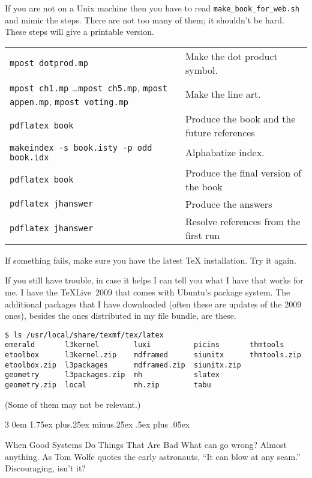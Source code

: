 \documentclass[titlepage]{article}
\makeatletter
\renewcommand{\subsubsection}{\@startsection{subsubsection}%
  {3}%
  {0em}%
  {1.75ex plus.25ex minus.25ex}%
  {.5ex plus .05ex}%
  {\bfseries\raggedright}}
\makeatother
\begin{document}
If you are not on a Unix machine then you have to read 
\verb!make_book_for_web.sh! and mimic the steps.
There are not too many of them; it shouldn't be hard.
These steps will give a printable version.  
\begin{center}
  \begin{tabular}{ll}
    \verb!mpost dotprod.mp!  &Make the dot product symbol.        \\ 
    \verb!mpost ch1.mp! \ldots \verb!mpost ch5.mp!, \verb!mpost appen.mp!, \verb!mpost voting.mp!  &Make the line art. \\
    \verb!pdflatex book!  &Produce the book and the future references       \\
    \verb!makeindex -s book.isty -p odd book.idx!  &Alphabatize index.  \\ 
    \verb!pdflatex book!  &Produce the final version of the book         \\
    \verb!pdflatex jhanswer!  &Produce the answers               \\
    \verb!pdflatex jhanswer!  &Resolve references from the first run  %
  \end{tabular}
\end{center}

If something fails, make sure you have the latest \TeX{} installation.
Try it again.

If you still have trouble, in case it helps I can tell you what I have that 
works for me.
I have the \TeX{}Live~2009 that comes with Ubuntu's package system.
The additional packages that I have downloaded (often these are updates
of the 2009 ones), 
besides the ones distributed in my file bundle, are these.
\begin{verbatim}
$ ls /usr/local/share/texmf/tex/latex
emerald       l3kernel        luxi          picins       thmtools
etoolbox      l3kernel.zip    mdframed      siunitx      thmtools.zip
etoolbox.zip  l3packages      mdframed.zip  siunitx.zip
geometry      l3packages.zip  mh            slatex
geometry.zip  local           mh.zip        tabu
\end{verbatim}
(Some of them may not be relevant.)





\subsubsection{When Good Systems Do Things That Are Bad}
What can go wrong?   
Almost anything.
As Tom Wolfe quotes the early astronauts, ``It can blow at any seam.''
Discouraging, isn't it?
\end{document}
